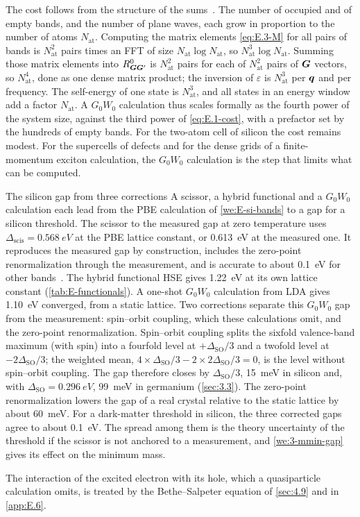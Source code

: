 The cost follows from the structure of the sums~\cite[Sect.~4]{deslippe2012berkeleygw}. The number of occupied and of empty bands, and the number of plane waves, each grow in proportion to the number of atoms $N_{\mathrm{at}}$. Computing the matrix elements \cref{eq:E.3-M} for all pairs of bands is $N_{\mathrm{at}}^2$ pairs times an FFT of size $N_{\mathrm{at}}\log N_{\mathrm{at}}$, so $N_{\mathrm{at}}^3\log N_{\mathrm{at}}$. Summing those matrix elements into $R^0_{\bm{G}\bm{G}'}$ is $N_{\mathrm{at}}^2$ pairs for each of $N_{\mathrm{at}}^2$ pairs of $\bm{G}$ vectors, so $N_{\mathrm{at}}^4$, done as one dense matrix product; the inversion of $\varepsilon$ is $N_{\mathrm{at}}^3$ per $\bm{q}$ and per frequency. The self-energy of one state is $N_{\mathrm{at}}^3$, and all states in an energy window add a factor $N_{\mathrm{at}}$. A $G_0W_0$ calculation thus scales formally as the fourth power of the system size, against the third power of \cref{eq:E.1-cost}, with a prefactor set by the hundreds of empty bands. For the two-atom cell of silicon the cost remains modest. For the supercells of defects and for the dense grids of a finite-momentum exciton calculation, the $G_0W_0$ calculation is the step that limits what can be computed.

\begin{workedexample}{The silicon gap from three corrections}\label{we:E-si-gap}
A scissor, a hybrid functional and a $G_0W_0$ calculation each lead from the PBE calculation of \cref{we:E-si-bands} to a gap for a silicon threshold. The scissor to the measured gap at zero temperature uses $\Delta_{\mathrm{scis}} = \SI{0.568}{eV}$ at the PBE lattice constant, or \SI{0.613}{eV} at the measured one. It reproduces the measured gap by construction, includes the zero-point renormalization through the measurement, and is accurate to about \SI{0.1}{eV} for other bands~\cite{godby1988self}. The hybrid functional HSE gives \SI{1.22}{eV} at its own lattice constant (\cref{tab:E-functionals}). A one-shot $G_0W_0$ calculation from LDA gives \SI{1.10}{eV} converged, from a static lattice. Two corrections separate this $G_0W_0$ gap from the measurement: spin--orbit coupling, which these calculations omit, and the zero-point renormalization. Spin--orbit coupling splits the sixfold valence-band maximum (with spin) into a fourfold level at $+\Delta_{\mathrm{SO}}/3$ and a twofold level at $-2\Delta_{\mathrm{SO}}/3$; the weighted mean, $4\times\Delta_{\mathrm{SO}}/3 - 2\times2\Delta_{\mathrm{SO}}/3 = 0$, is the level without spin--orbit coupling. The gap therefore closes by $\Delta_{\mathrm{SO}}/3$, \SI{15}{meV} in silicon and, with $\Delta_{\mathrm{SO}} = \SI{0.296}{eV}$, \SI{99}{meV} in germanium (\cref{sec:3.3}). The zero-point renormalization lowers the gap of a real crystal relative to the static lattice by about \SI{60}{meV}. For a dark-matter threshold in silicon, the three corrected gaps agree to about \SI{0.1}{eV}. The spread among them is the theory uncertainty of the threshold if the scissor is not anchored to a measurement, and \cref{we:3-mmin-gap} gives its effect on the minimum mass.
\end{workedexample}

The interaction of the excited electron with its hole, which a quasiparticle calculation omits, is treated by the Bethe--Salpeter equation of \cref{sec:4.9} and in \cref{app:E.6}.
